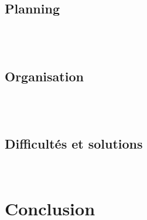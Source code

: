 \documentclass[a4paper,11pt]{article}
\begin{document}
	    \subsection{ Planning }
	    
	    
	    
	    ~\\
	    ~\\	    
	    \subsection{ Organisation }
	    
	    
	    ~\\
	    ~\\	    
	    \subsection{ Difficultés et solutions} \label{ret}
	    
	    
	    
	    
	    ~\\
	     
			    
\section{ Conclusion }




		   
		   
\appendix %
		   

		   
\newpage		   
~\\ 		   			    
\end{document}
